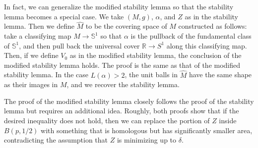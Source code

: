 \documentclass[12pt]{amsart}
\numberwithin{equation}{section}
\begin{document}
In fact, we can generalize the modified stability lemma so that the stability lemma becomes a special case.  We take $(M, g)$, $\alpha$, and $Z$ as in the stability lemma.  Then we define $\widehat{M}$ to be the covering space of $M$ constructed as follows: take a classifying map $M \rightarrow \mathbb{S}^1$ so that $\alpha$ is the pullback of the fundamental class of $\mathbb{S}^1$, and then pull back the universal cover $\mathbb{R} \rightarrow S^1$ along this classifying map.  Then, if we define $V_0$ as in the modified stability lemma, the conclusion of the modified stability lemma holds.  The proof is the same as that of the modified stability lemma.  In the case $L(\alpha) > 2$, the unit balls in $\widehat{M}$ have the same shape as their images in $M$, and we recover the stability lemma.

The proof of the modified stability lemma closely follows the proof of the stability lemma but requires an additional idea.  Roughly, both proofs show that if the desired inequality does not hold, then we can replace the portion of $Z$ inside $B(p, 1/2)$ with something that is homologous but has significantly smaller area, contradicting the assumption that $Z$ is minimizing up to $\delta$.
\end{document}

